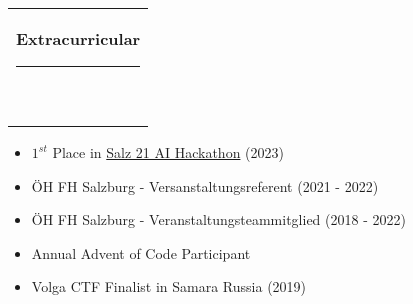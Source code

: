 \documentclass[10pt,A4]{article}
\newcommand{\mpwidth}{\linewidth-\fboxsep-\fboxsep}
\newcommand{\cvtext}[1] {
	\begin{tabular*}{1\mpwidth}{p{0.98\mpwidth}}
		\parbox{1\mpwidth}{#1}
	\end{tabular*}
}
\newcommand{\cvsection}[1] {
	\vspace{14pt}
	\cvtext{
		\textbf{\LARGE{\textcolor{darkcol}{#1}}}\\[-4pt]
		\textcolor{maincol}{ \rule{0.1\textwidth}{2pt} } \\
	}
}
\begin{document}
\begin{paracol}{2}
\begin{rightcolumn}
\vfill\null
\cvsection{Extracurricular}
\vspace{-0.3cm}
\begin{itemize}
	\item $1^{st}$ Place in \href{https://www.fh-salzburg.ac.at/en/about-fh-salzburg/news-and-events/news?tx_news_pi1%5Baction%5D=detail&tx_news_pi1%5Bcontroller%5D=News&tx_news_pi1%5Bnews%5D=4120&cHash=62d1ec8864492e7b9b17af9e60e6c6c3}{Salz 21 AI Hackathon} (2023)
  \item ÖH FH Salzburg - Versanstaltungsreferent (2021 - 2022)
  \item ÖH FH Salzburg - Veranstaltungsteammitglied (2018 - 2022)
  \item Annual Advent of Code Participant
  \item Volga CTF Finalist in Samara Russia (2019)
\end{itemize}
\vfill\null


\vfill
\vfill
\vfill
\end{rightcolumn}
\end{paracol}
\end{document}
